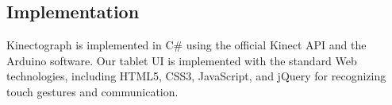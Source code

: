 \subsection{Implementation}
Kinectograph is implemented in C\# using the official Kinect API and the Arduino software. Our tablet UI is implemented with the standard Web technologies, including HTML5, CSS3, JavaScript, and jQuery for recognizing touch gestures and communication.

